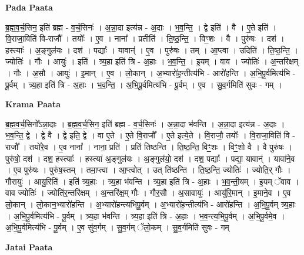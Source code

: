 \documentclass[17pt]{extarticle}
\begin{document}
\textbf{Pada Paata} \newline

ब्र॒ह्म॒व॒र्च॒सिन॒ इति॑ ब्रह्म - व॒र्च॒सिनः॑ । अ॒न्ना॒दा इत्य॑न्न - अ॒दाः । भ॒व॒न्ति॒ । द्वे इति॑ । वै । ए॒ते इति॑ । वि॒राजा॒विति॑ वि-राजौ᳚ । तयोः᳚ । ए॒व । नाना᳚ । प्रतीति॑ । ति॒ष्ठ॒न्ति॒ । विꣳ॒॒शः । वै । पुरु॑षः । दश॑ । हस्त्याः᳚ । अ॒ङ्गुल॑यः । दश॑ । पद्याः᳚ । यावान्॑ । ए॒व । पुरु॑षः । तम् । आ॒प्त्वा । उदिति॑ । ति॒ष्ठ॒न्ति॒ । ज्योतिः॑ । गौः । आयुः॑ । इति॑ । त्र्य॒हा इति॑ त्रि - अ॒हाः । भ॒व॒न्ति॒ । इ॒यम् । वाव । ज्योतिः॑ । अ॒न्तरि॑क्षम् । गौः । अ॒सौ । आयुः॑ । इ॒मान् । ए॒व । लो॒कान् । अ॒भ्यारो॑ह॒न्तीत्य॑भि - आरो॑हन्ति । अ॒भि॒पू॒र्वमित्य॑भि - पू॒र्वम् । त्र्य॒हा इति॑ त्रि - अ॒हाः । भ॒व॒न्ति॒ । अ॒भि॒पू॒र्वमित्य॑भि - पू॒र्वम् । ए॒व । सु॒व॒र्गमिति॑ सुवः - गम् ।  \newline


\textbf{Krama Paata} \newline

ब्र॒ह्म॒व॒र्च॒सिनो᳚ऽन्ना॒दाः । ब्र॒ह्म॒व॒र्च॒सिन॒ इति॑ ब्रह्म - व॒र्च॒सिनः॑ । अ॒न्ना॒दा भ॑वन्ति । अ॒न्ना॒दा इत्य॑न्न - अ॒दाः । भ॒व॒न्ति॒ द्वे । द्वे वै । द्वे इति॒ द्वे । वा ए॒ते । ए॒ते वि॒राजौ᳚ । ए॒ते इत्ये॒ते । वि॒राजौ॒ तयोः᳚ । वि॒राजा॒विति॑ वि - राजौ᳚ । तयो॑रे॒व । ए॒व नाना᳚ । नाना॒ प्रति॑ । प्रति॑ तिष्ठन्ति । ति॒ष्ठ॒न्ति॒ विꣳ॒॒शः । विꣳ॒॒शो वै । वै पुरु॑षः । पुरु॑षो॒ दश॑ । दश॒ हस्त्याः᳚ । हस्त्या॑ अ॒ङ्‍गुल॑यः । अ॒ङ्‍गुल॑यो॒ दश॑ । दश॒ पद्याः᳚ । पद्या॒ यावान्॑ । यावा॑ने॒व । ए॒व पुरु॑षः । पुरु॑ष॒स्तम् । तमा॒प्त्वा । आ॒प्त्वोत् । उत् ति॑ष्ठन्ति । ति॒ष्ठ॒न्ति॒ ज्योतिः॑ । ज्योति॒र् गौः । गौरायुः॑ । आयु॒रिति॑ । इति॑ त्र्य॒हाः । त्र्य॒हा भ॑वन्ति । त्र्य॒हा इति॑ त्रि - अ॒हाः । भ॒व॒न्ती॒यम् । इ॒यम् ॅवाव । वाव ज्योतिः॑ । ज्योति॑र॒न्तरि॑क्षम् । अ॒न्तरि॑क्ष॒म् गौः । गौर॒सौ । अ॒सावायुः॑ । आयु॑रि॒मान् । इ॒माने॒व । ए॒व लो॒कान् । लो॒कान॒भ्यारो॑हन्ति । अ॒भ्यारो॑हन्त्यभिपू॒र्वम् । अ॒भ्यारो॑ह॒न्तीत्य॑भि - आरो॑हन्ति । अ॒भि॒पू॒र्वम् त्र्य॒हाः । अ॒भि॒पू॒र्वमित्य॑भि - पू॒र्वम् । त्र्य॒हा भ॑वन्ति । त्र्य॒हा इति॑ त्रि - अ॒हाः । भ॒व॒न्त्य॒भि॒पू॒र्वम् । अ॒भि॒पू॒र्वमे॒व । अ॒भि॒पू॒र्वमित्य॑भि - पू॒र्वम् । ए॒व सु॑व॒र्गम् । सु॒व॒र्गम् ॅलो॒कम् । सु॒व॒र्गमिति॑ सुवः - गम् \newline

\textbf{Jatai Paata} \newline
\end{document}
